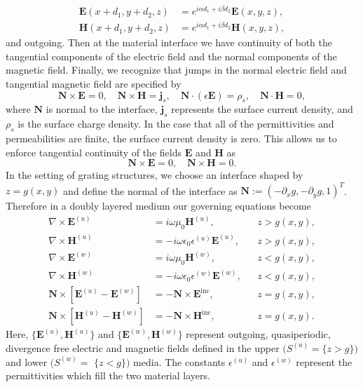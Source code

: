 \begin{subequations}
\begin{align}
\textbf{E}(x+d_1,y+d_2,z)&=e^{i\alpha d_1 + i\beta d_2}\textbf{E}(x,y,z),\\
\textbf{H}(x+d_1,y+d_2,z)&=e^{i\alpha d_1 + i\beta d_2}\textbf{H}(x,y,z),
\end{align}
\end{subequations}
and outgoing. Then at the material interface \cite{BillinghamKing00} we have continuity of both the tangential components of the electric field and the normal components of the magnetic field. Finally, we recognize that jumps in the normal electric field and tangential magnetic field are specified by
\begin{equation}
\textbf{N}\times \textbf{E}=0, \quad \textbf{N}\times \textbf{H} = \textbf{j}_s,\quad \textbf{N}\cdot (\epsilon \textbf{E})=\rho_s, \quad \textbf{N}\cdot \textbf{H} =0,
\end{equation}
where $\textbf{N}$ is normal to the interface, $\textbf{j}_s$ represents the surface current density, and $\rho_s$ is the surface charge density. In the case that all of the permittivities and permeabilities are finite, the surface current density is zero. This allows us to enforce tangential continuity of the fields $\textbf{E}$ and $\textbf{H}$ as 
\begin{equation}
    \textbf{N}\times \textbf{E} = 0, \quad \textbf{N}\times \textbf{H} = 0.
\end{equation}
In the setting of grating structures, we choose an interface shaped by $z=g(x,y)$ and define the normal of the interface as $\textbf{N}:=(-\partial_x g, -\partial_y g,1)^T$. Therefore in a doubly layered medium our governing equations become
\vspace{-2.74mm}
\begin{subequations}
\begin{align}
\nabla \times \textbf{E}^{(u)} &= i\omega\mu_0 \textbf{H}^{(u)}, && z>g(x,y),\\
\nabla \times \textbf{H}^{(u)} &= -i\omega\epsilon_0\epsilon^{(u)} \textbf{E}^{(u)},&& z>g(x,y),\\
\nabla \times \textbf{E}^{(w)} &= i\omega\mu_0 \textbf{H}^{(w)},&& z<g(x,y),\\
\nabla \times \textbf{H}^{(w)} &= -i\omega\epsilon_0\epsilon^{(w)}  \textbf{E}^{(w)},&& z<g(x,y),\\
\textbf{N}\times \left[\textbf{E}^{(u)}-\textbf{E}^{(w)}\right]&=-\textbf{N}\times \textbf{E}^{\text{inc}},&& z=g(x,y),\\
\textbf{N}\times \left[\textbf{H}^{(u)}-\textbf{H}^{(w)}\right]&=-\textbf{N}\times \textbf{H}^{\text{inc}},&& z=g(x,y).
\end{align}
\end{subequations}
Here, $\{\textbf{E}^{(u)},\textbf{H}^{(u)}\}$ and $\{\textbf{E}^{(w)},\textbf{H}^{(w)}\}$ represent outgoing, quasiperiodic, divergence free electric and magnetic fields defined in the upper $\big(S^{(u)}=\{z > g\}\big)$ and lower $\big(S^{(w)}=$ $\{z<g\}\big)$ media. The constants  $\epsilon^{(u)}$ and $\epsilon^{(w)}$ represent the permittivities which fill the two material layers. 

